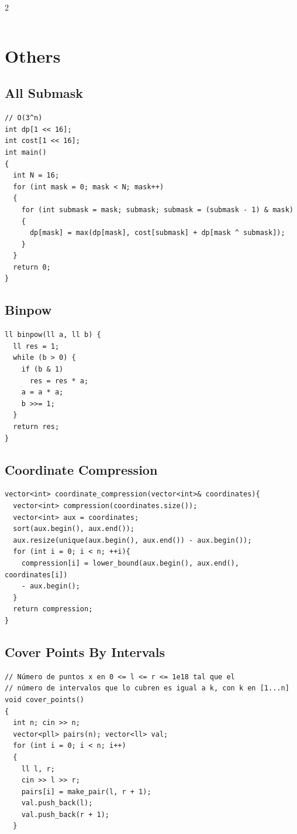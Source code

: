 \documentclass[twoside]{article}
\begin{document}
\begin{multicols*}{2}
\begin{verbatim}
\end{verbatim}

	{
		\section*{Others}
	}
	{
		\subsection*{All Submask}
	}
	\begin{verbatim}
// O(3^n)
int dp[1 << 16];
int cost[1 << 16];
int main()
{
  int N = 16;
  for (int mask = 0; mask < N; mask++)
  {
    for (int submask = mask; submask; submask = (submask - 1) & mask)
    {
      dp[mask] = max(dp[mask], cost[submask] + dp[mask ^ submask]);
    }
  }
  return 0;
}
\end{verbatim}

	{
		\subsection*{Binpow}
	}
	\begin{verbatim}
ll binpow(ll a, ll b) {
  ll res = 1;
  while (b > 0) {
    if (b & 1)
      res = res * a;
    a = a * a;
    b >>= 1;
  }
  return res;
}
\end{verbatim}

	{
		\subsection*{Coordinate Compression}
	}
	\begin{verbatim}
vector<int> coordinate_compression(vector<int>& coordinates){
  vector<int> compression(coordinates.size()); 
  vector<int> aux = coordinates;
  sort(aux.begin(), aux.end());
  aux.resize(unique(aux.begin(), aux.end()) - aux.begin());
  for (int i = 0; i < n; ++i){
    compression[i] = lower_bound(aux.begin(), aux.end(), coordinates[i]) 
    - aux.begin();
  }
  return compression; 
}
\end{verbatim}

	{
		\subsection*{Cover Points By Intervals}
	}
	\begin{verbatim}
// Número de puntos x en 0 <= l <= r <= 1e18 tal que el 
// número de intervalos que lo cubren es igual a k, con k en [1...n]
void cover_points()
{
  int n; cin >> n;
  vector<pll> pairs(n); vector<ll> val;
  for (int i = 0; i < n; i++)
  {
    ll l, r;
    cin >> l >> r;
    pairs[i] = make_pair(l, r + 1);
    val.push_back(l);
    val.push_back(r + 1);
  }


\end{verbatim}
\end{multicols*}
\end{document}
